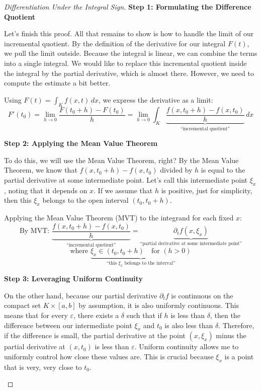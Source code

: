 \begin{proof}[Differentiation Under the Integral Sign]

\textbf{Step 1: Formulating the Difference Quotient}
\begin{spoken-clean}[00:00:09 - 00:01:20]
Let's finish this proof. All that remains to show is how to handle the limit of our incremental quotient. By the definition of the derivative for our integral $F(t)$, we pull the limit outside. Because the integral is linear, we can combine the terms into a single integral. We would like to replace this incremental quotient inside the integral by the partial derivative, which is almost there. However, we need to compute the estimate a bit better.
\end{spoken-clean}

\begin{math-stroke}
Using $F(t) = \int_K f(x,t) \, dx$, we express the derivative as a limit:
\[
F'(t_0) = \lim_{h \to 0} \frac{F(t_0+h) - F(t_0)}{h} = \lim_{h \to 0} \int_K \underbrace{\frac{f(x,t_0+h) - f(x,t_0)}{h}}_{\text{``incremental quotient''}} \, dx
\]
\end{math-stroke}

\textbf{Step 2: Applying the Mean Value Theorem}
\begin{spoken-clean}[00:01:20 - 00:02:10]
To do this, we will use the Mean Value Theorem, right? By the Mean Value Theorem, we know that $f(x, t_0 + h) - f(x, t_0)$ divided by $h$ is equal to the partial derivative at some intermediate point. Let's call this intermediate point $\xi_x$, noting that it depends on $x$. If we assume that $h$ is positive, just for simplicity, then this $\xi_x$ belongs to the open interval $(t_0, t_0 + h)$.
\end{spoken-clean}

\begin{math-stroke}
Applying the Mean Value Theorem (MVT) to the integrand for each fixed $x$:
\[
\text{By MVT: } \underbrace{\frac{f(x, t_0+h) - f(x, t_0)}{h}}_{\text{``incremental quotient''}} = \underbrace{\partial_t f(x, \xi_x)}_{\text{``partial derivative at some intermediate point''}}
\]
\[
\text{where } \underbrace{\xi_x \in (t_0, t_0+h) \quad \text{for } (h>0)}_{\text{``this } \xi_x \text{ belongs to the interval''}}
\]
\end{math-stroke}

\textbf{Step 3: Leveraging Uniform Continuity}
\begin{spoken-clean}[00:02:10 - 00:03:00]
On the other hand, because our partial derivative $\partial_t f$ is continuous on the compact set $K \times [a,b]$ by assumption, it is also uniformly continuous. This means that for every $\varepsilon$, there exists a $\delta$ such that if $h$ is less than $\delta$, then the difference between our intermediate point $\xi_x$ and $t_0$ is also less than $\delta$. Therefore, if the difference is small, the partial derivative at the point $(x, \xi_x)$ minus the partial derivative at $(x, t_0)$ is less than $\varepsilon$. Uniform continuity allows me to uniformly control how close these values are. This is crucial because $\xi_x$ is a point that is very, very close to $t_0$.
\end{spoken-clean}


\end{proof}
